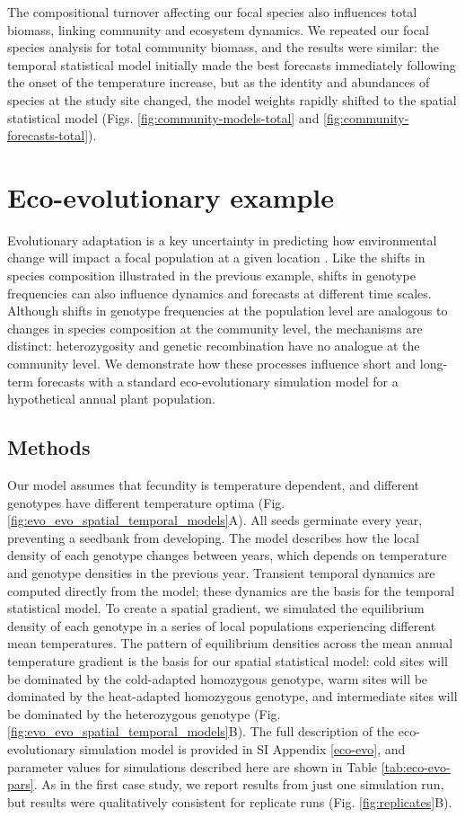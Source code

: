 \documentclass[11pt]{article}
\begin{document}
The compositional turnover affecting our focal species also influences total biomass, linking community and ecosystem dynamics. We repeated our focal species analysis for total community biomass, and the results were similar: the temporal statistical model initially made the best forecasts immediately following the onset of the temperature increase, but as the identity and abundances of species at the study site changed, the model weights rapidly shifted to the spatial statistical model (Figs. \ref{fig:community-models-total} and \ref{fig:community-forecasts-total}). 

\section*{Eco-evolutionary example}

Evolutionary adaptation is a key uncertainty in predicting how environmental change will impact a focal population at a given location \citep{Hoffmann2011}. Like the shifts in species composition illustrated in the previous example, shifts in genotype frequencies can also influence dynamics and forecasts at different time scales. Although shifts in genotype frequencies at the population level are analogous to changes in species composition at the community level, the mechanisms are distinct: heterozygosity and genetic recombination have no analogue at the community level. We demonstrate how these processes influence short and long-term forecasts with a standard eco-evolutionary simulation model for a hypothetical annual plant population. 

\subsection*{Methods}

Our model assumes that fecundity is temperature dependent, and different genotypes have different temperature optima (Fig. \ref{fig:evo_evo_spatial_temporal_models}A). All seeds germinate every year, preventing a seedbank from developing. The model describes how the local density of each genotype changes between years, which depends on temperature and genotype densities in the previous year. Transient temporal dynamics are computed directly from the model; these dynamics are the basis for the temporal statistical model. To create a spatial gradient, we simulated the equilibrium density of each genotype in a series of local populations experiencing different mean temperatures. The pattern of equilibrium densities across the mean annual temperature gradient is the basis for our spatial statistical model: cold sites will be dominated by the cold-adapted homozygous genotype, warm sites will be dominated by the heat-adapted homozygous genotype, and intermediate sites will be dominated by the heterozygous genotype (Fig. \ref{fig:evo_evo_spatial_temporal_models}B). The full description of the eco-evolutionary simulation model is provided in SI Appendix \ref{eco-evo}, and parameter values for simulations described here are shown in Table \ref{tab:eco-evo-pars}. As in the first case study, we report results from just one simulation run, but results were qualitatively consistent for replicate runs (Fig. \ref{fig:replicates}B).
\end{document}
